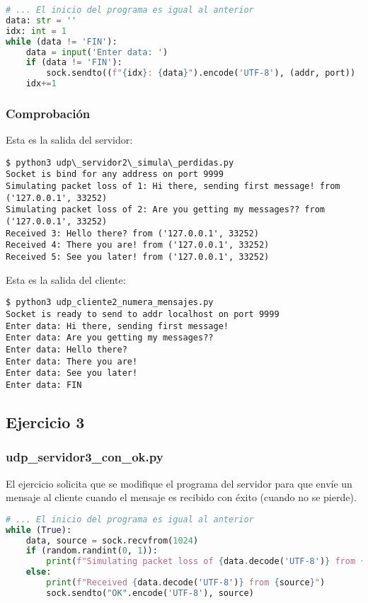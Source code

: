 \begin{lstlisting}[language=Python]
# ... El inicio del programa es igual al anterior
data: str = ''
idx: int = 1
while (data != 'FIN'):
    data = input('Enter data: ')
    if (data != 'FIN'):
        sock.sendto((f"{idx}: {data}").encode('UTF-8'), (addr, port))
    idx+=1
\end{lstlisting}

\subsubsection{Comprobación}

Esta es la salida del servidor:

\begin{lstlisting}
$ python3 udp\_servidor2\_simula\_perdidas.py
Socket is bind for any address on port 9999
Simulating packet loss of 1: Hi there, sending first message! from ('127.0.0.1', 33252)
Simulating packet loss of 2: Are you getting my messages?? from ('127.0.0.1', 33252)
Received 3: Hello there? from ('127.0.0.1', 33252)
Received 4: There you are! from ('127.0.0.1', 33252)
Received 5: See you later! from ('127.0.0.1', 33252)
\end{lstlisting}

Esta es la salida del cliente:

\begin{lstlisting}
$ python3 udp_cliente2_numera_mensajes.py
Socket is ready to send to addr localhost on port 9999
Enter data: Hi there, sending first message!
Enter data: Are you getting my messages??
Enter data: Hello there? 
Enter data: There you are!
Enter data: See you later!
Enter data: FIN
\end{lstlisting}

\subsection{Ejercicio 3}

\subsubsection{udp\_servidor3\_con\_ok.py}

El ejercicio solicita que se modifique el programa del servidor para que envíe un mensaje al cliente
cuando el mensaje es recibido con éxito (cuando no se pierde).

\begin{lstlisting}[language=Python]
# ... El inicio del programa es igual al anterior
while (True):
    data, source = sock.recvfrom(1024)
    if (random.randint(0, 1)):
        print(f"Simulating packet loss of {data.decode('UTF-8')} from {source}")
    else:
        print(f"Received {data.decode('UTF-8')} from {source}")
        sock.sendto("OK".encode('UTF-8'), source)
\end{lstlisting}

